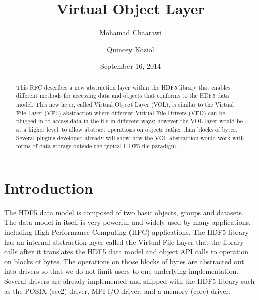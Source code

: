 \documentclass[letterpaper,hyper]{THG_RFC}
\title{Virtual Object Layer}
\author{Mohamad Chaarawi}
\author{Quincey Koziol}
\date{September 16, 2014}
\begin{document}
\maketitle

\begin{abstract}
This RFC describes a new abstraction layer within the HDF5 library that enables different methods for accessing data and objects that conforms to the HDF5 data model. This new layer, called Virtual Object Layer (VOL), is similar to the Virtual File Layer (VFL) abstraction where different Virtual File Drivers (VFD) can be plugged in to access data in the file in different ways; however the VOL layer would be at a higher level, to allow abstract operations on objects rather than blocks of bytes. Several plugins developed already will show how the VOL abstraction would work with forms of data storage outside the typical HDF5 file paradigm.
\end{abstract}

\section{Introduction}
The HDF5 data model is composed of two basic objects, groups and datasets. The data model in itself is very powerful and widely used by many applications, including High Performance Computing (HPC) applications. The HDF5 library has an internal abstraction layer called the Virtual File Layer that the library calls after it translates the HDF5 data model and object API calls to operation on blocks of bytes. The operations on those blocks of bytes are abstracted out into drivers so that we do not limit users to one underlying implementation. Several drivers are already implemented and shipped with the HDF5 library such as the POSIX (sec2) driver, MPI-I/O driver, and a memory (core) driver.
\end{document}
